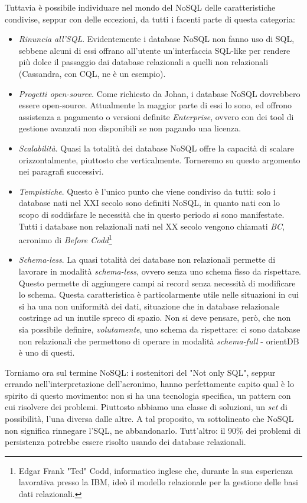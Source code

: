 Tuttavia è possibile individuare nel mondo del NoSQL delle caratteristiche condivise, seppur con delle eccezioni, da tutti i facenti parte di questa categoria:
\begin{itemize}
\item \emph{Rinuncia all'SQL}. Evidentemente i database NoSQL non fanno uso di SQL, sebbene alcuni di essi offrano all'utente un'interfaccia SQL-like per rendere più dolce il passaggio dai database relazionali a quelli non relazionali (Cassandra, con CQL, ne è un esempio).
\item \emph{Progetti open-source}. Come richiesto da Johan, i database NoSQL dovrebbero essere open-source. Attualmente la maggior parte di essi lo sono, ed offrono assistenza a pagamento o versioni definite \emph{Enterprise}, ovvero con dei tool di gestione avanzati non disponibili se non pagando una licenza.
\item \emph{Scalabilità}. Quasi la totalità dei database NoSQL offre la capacità di scalare orizzontalmente, piuttosto che verticalmente. Torneremo su questo argomento nei paragrafi successivi.
\item \emph{Tempistiche}. Questo è l'unico punto che viene condiviso da tutti: solo i database nati nel XXI secolo sono definiti NoSQL, in quanto nati con lo scopo di soddisfare le necessità che in questo periodo si sono manifestate. Tutti i database non relazionali nati nel XX secolo vengono chiamati \emph{BC}, acronimo di 
\emph{Before Codd}\footnote{Edgar Frank "Ted" Codd, informatico inglese che, durante la sua esperienza lavorativa presso la IBM, ideò il modello relazionale per la gestione delle basi dati relazionali.}
\item \emph{Schema-less}. La quasi totalità dei database non relazionali permette di lavorare in modalità \emph{schema-less}, ovvero senza uno schema fisso da rispettare. Questo permette di aggiungere campi ai record senza necessità di modificare lo schema. Questa caratteristica è particolarmente utile nelle situazioni in cui si ha una non uniformità dei dati, situazione che in database relazionale costringe ad un inutile spreco di spazio. Non si deve pensare, però, che non sia possibile definire, \emph{volutamente}, uno schema da rispettare: ci sono database non relazionali che permettono di operare in modalità \emph{schema-full} - orientDB è uno di questi.
\end{itemize}

Torniamo ora sul termine NoSQL: i sostenitori del "Not only SQL", seppur errando nell'interpretazione dell'acronimo, hanno perfettamente capito qual è lo spirito di questo movimento: non si ha una tecnologia specifica, un pattern con cui risolvere dei problemi. Piuttosto abbiamo una classe di soluzioni, un \emph{set} di possibilità, l'una diversa dalle altre. A tal proposito, va sottolineato che NoSQL non significa rinnegare l'SQL, ne abbandonarlo. Tutt'altro: il 90\% dei problemi di persistenza potrebbe essere risolto usando dei database relazionali.

